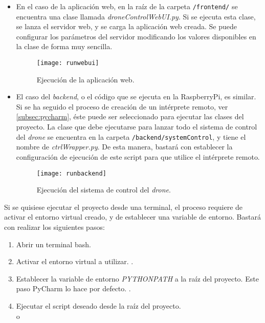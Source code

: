 \begin{itemize}
\item En el caso de la aplicación web, en la raíz de la carpeta \texttt{/frontend/} se encuentra una clase llamada \emph{droneControlWebUI.py}. Si se ejecuta esta clase, se lanza el servidor web, y se carga la aplicación web creada. Se puede configurar los parámetros del servidor modificando los valores disponibles en la clase de forma muy sencilla.
\begin{figure}[H]
	\centering
	\texttt{[image: runwebui]}
	\caption[Ejecución de aplicación web]{Ejecución de la aplicación web.}\label{fig:runwebui}
\end{figure}

\item El caso del \emph{backend}, o el código que se ejecuta en la RaspberryPi, es similar. Si se ha seguido el proceso de creación de un intérprete remoto, ver \ref{subsec:pycharm}, éste puede ser seleccionado para ejecutar las clases del proyecto. La clase que debe ejecutarse para lanzar todo el sistema de control del \emph{drone} se encuentra en la carpeta \texttt{/backend/systemControl}, y tiene el nombre de \emph{ctrlWrapper.py}. De esta manera, bastará con establecer la configuración de ejecución de este script para que utilice el intérprete remoto.

\begin{figure}[H]
	\centering
	\texttt{[image: runbackend]}
	\caption[Ejecución del sistema de control]{Ejecución del sistema de control del \emph{drone}.}\label{fig:runbackend}
\end{figure}
\end{itemize}

Si se quisiese ejecutar el proyecto desde una terminal, el proceso requiere de activar el entorno virtual creado, y de establecer una variable de entorno. Bastará con realizar los siguientes pasos:

\begin{enumerate}
\item Abrir un terminal bash.
\item Activar el entorno virtual a utilizar. .
\item Establecer la variable de entorno \emph{PYTHONPATH} a la raíz del proyecto. Este paso PyCharm lo hace por defecto. .
\item Ejecutar el script deseado desde la raíz del proyecto.\\  o \\ 
\end{enumerate}


